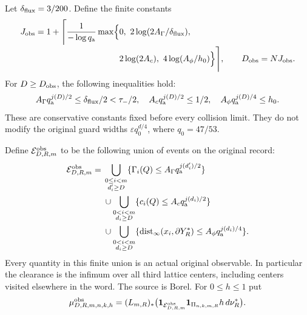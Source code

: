 Let $\delta_{\rm flux}=3/200$.  Define the finite constants
\begin{equation}\label{eq:ec-observation-depth}
 \begin{split}
 J_{\rm obs}=1+\Biggl\lceil\frac{1}{-\log q_{\rm a}}\max\Bigl\{&
 0,\ 2\log(2A_\Gamma/\delta_{\rm flux}),\\[-2pt]
 &2\log(2A_c),\ 4\log(A_\phi/h_0)\Bigr\}\Biggr\rceil,
 \qquad D_{\rm obs}=NJ_{\rm obs}.
 \end{split}
\end{equation}
For $D\ge D_{\rm obs}$, the following inequalities hold:
\begin{equation}\label{eq:ec-small-widths}
 A_\Gamma q_{\rm a}^{j(D)/2}\le\delta_{\rm flux}/2<\tau_-/2,
 \quad A_cq_{\rm a}^{j(D)/2}\le1/2,
 \quad A_\phi q_{\rm a}^{j(D)/4}\le h_0.
\end{equation}
These are conservative constants fixed before every collision limit.
They do not modify the original guard widths
$\varepsilon q_0^{d/4}$, where $q_0=47/53$.

Define $\mathcal E^{\rm obs}_{D,R,m}$ to be the following union of
events on the original record:
\begin{equation}\label{eq:ec-bad-source}
 \begin{split}
 \mathcal E^{\rm obs}_{D,R,m}
 ={}&
 \bigcup_{\substack{0\le i<m\\d'_i\ge D}}
 \{\Gamma_i(Q)\le A_\Gamma q_{\rm a}^{j(d'_i)/2}\}\\
 &{}\cup\bigcup_{\substack{0<i<m\\d_i\ge D}}
 \{c_i(Q)\le A_c q_{\rm a}^{j(d_i)/2}\}\\
 &{}\cup\bigcup_{\substack{0<i<m\\d_i\ge D}}
 \{\operatorname{dist}_\infty(x_i,\partial Y_R^*)
                       \le A_\phi q_{\rm a}^{j(d_i)/4}\}.
 \end{split}
\end{equation}
Every quantity in this finite union is an actual original observable.
In particular the clearance is the infimum over all third lattice
centers, including centers visited elsewhere in the word.  The
source is Borel.  For $0\le h\le1$ put
\[
 \mu^{\rm obs}_{D,R,m,n,k,h}
   =(L_{m,R})_*
     \bigl(\mathbf1_{\mathcal E^{\rm obs}_{D,R,m}}\mathbf1_{\Pi_{n,k,m,R}}
                                             h\,d\nu_R^*\bigr).
\]

